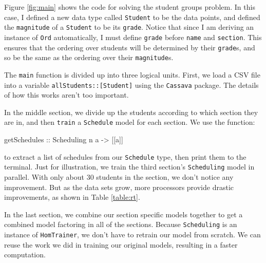 \documentclass[tikz]{tmr}
\newcommand\h{\lstinline}
\newcommand\+{\mdoubleplus}
\begin{document}
Figure \ref{fig:main} shows the code for solving the student groups problem.
In this case, I defined a new data type called \h{Student} to be the data points, and defined the \h{magnitude} of a \h{Student} to be its \h{grade}.
Notice that since I am deriving an instance of \h{Ord} automatically, I must define \h{grade} before \h{name} and \h{section}.
This ensures that the ordering over students will be determined by their \h{grade}s, and so be the same as the ordering over their \h{magnitude}s.

The \h{main} function is divided up into three logical units.
First, we load a CSV file into a variable
\h{allStudents::[Student]}
using the \h{Cassava} package.
The details of how this works aren't too important.

In the middle section, we divide up the students according to which section they are in, and then \h{train} a \h{Schedule} model for each section.
We use the function:
\begin{spec}
getSchedules :: Scheduling n a -> [[a]]
\end{spec}
to extract a list of schedules from our \h{Schedule} type, then print them to the terminal.
Just for illustration, we train the third section's \h{Scheduling} model in parallel.
With only about 30 students in the section, we don't notice any improvement.
But as the data sets grow, more processors provide drastic improvements, as shown in Table \ref{table:rt}.

In the last section, we combine our section specific models together to get a combined model factoring in all of the sections.
Because \h{Scheduling} is an instance of \h{HomTrainer}, we don't have to retrain our model from scratch.
We can reuse the work we did in training our original models, resulting in a faster computation.

\end{document}
